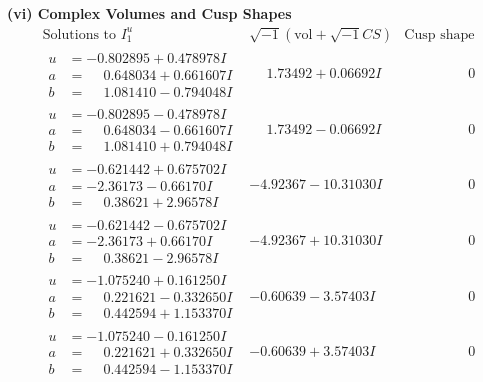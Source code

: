 \documentclass[1p]{elsarticle_modified}
\theoremstyle{definition}
\newcommand{\I}{\sqrt{-1}}
\begin{document}
\newpage\flushleft \textbf{(vi) Complex Volumes and Cusp Shapes}
$$\begin{array}{c|c|c}  
\text{Solutions to }I^u_{1}& \I (\text{vol} + \sqrt{-1}CS) & \text{Cusp shape}\\
 \hline 
\begin{aligned}
u &= -0.802895 + 0.478978 I \\
a &= \phantom{-}0.648034 + 0.661607 I \\
b &= \phantom{-}1.081410 - 0.794048 I\end{aligned}
 & \phantom{-}1.73492 + 0.06692 I & \phantom{-0.000000 } 0 \\ \hline\begin{aligned}
u &= -0.802895 - 0.478978 I \\
a &= \phantom{-}0.648034 - 0.661607 I \\
b &= \phantom{-}1.081410 + 0.794048 I\end{aligned}
 & \phantom{-}1.73492 - 0.06692 I & \phantom{-0.000000 } 0 \\ \hline\begin{aligned}
u &= -0.621442 + 0.675702 I \\
a &= -2.36173 - 0.66170 I \\
b &= \phantom{-}0.38621 + 2.96578 I\end{aligned}
 & -4.92367 - 10.31030 I & \phantom{-0.000000 } 0 \\ \hline\begin{aligned}
u &= -0.621442 - 0.675702 I \\
a &= -2.36173 + 0.66170 I \\
b &= \phantom{-}0.38621 - 2.96578 I\end{aligned}
 & -4.92367 + 10.31030 I & \phantom{-0.000000 } 0 \\ \hline\begin{aligned}
u &= -1.075240 + 0.161250 I \\
a &= \phantom{-}0.221621 - 0.332650 I \\
b &= \phantom{-}0.442594 + 1.153370 I\end{aligned}
 & -0.60639 - 3.57403 I & \phantom{-0.000000 } 0 \\ \hline\begin{aligned}
u &= -1.075240 - 0.161250 I \\
a &= \phantom{-}0.221621 + 0.332650 I \\
b &= \phantom{-}0.442594 - 1.153370 I\end{aligned}
 & -0.60639 + 3.57403 I & \phantom{-0.000000 } 0 \\ \hline\begin{aligned}

\end{aligned}
\end{array}$$
\end{document}
